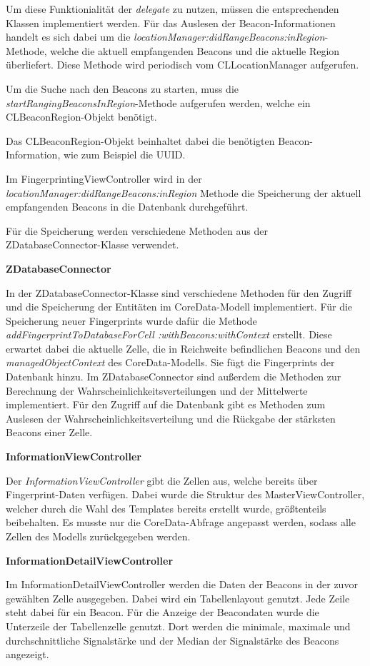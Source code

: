 Um diese Funktionialität der \emph{delegate} zu nutzen, müssen die entsprechenden Klassen implementiert werden. Für das Auslesen der Beacon-Informationen handelt es sich dabei um die \emph{locationManager:didRangeBeacons:inRegion}-Methode, welche die aktuell empfangenden Beacons und die aktuelle Region überliefert. Diese Methode wird periodisch vom CLLocationManager aufgerufen.

Um die Suche nach den Beacons zu starten, muss die \emph{startRangingBeaconsInRegion}-Methode aufgerufen werden, welche ein CLBeaconRegion-Objekt benötigt.

Das CLBeaconRegion-Objekt beinhaltet dabei die benötigten Beacon-Information, wie zum Beispiel die UUID.

Im FingerprintingViewController wird in der \emph{locationManager:didRangeBeacons:inRegion} Methode die Speicherung der aktuell empfangenden Beacons in die Datenbank durchgeführt.

Für die Speicherung werden verschiedene Methoden aus der ZDatabaseConnector-Klasse verwendet.

\textbf{ZDatabaseConnector}

In der ZDatabaseConnector-Klasse sind verschiedene Methoden für den Zugriff und die Speicherung der Entitäten im CoreData-Modell implementiert.
Für die Speicherung neuer Fingerprints wurde dafür die Methode \emph{addFingerprintToDatabaseForCell :withBeacons:withContext} erstellt. Diese erwartet dabei die aktuelle Zelle, die in Reichweite befindlichen Beacons und den \emph{managedObjectContext} des CoreData-Modells. Sie fügt die Fingerprints der Datenbank hinzu.
Im ZDatabaseConnector sind außerdem die Methoden zur Berechnung der Wahrscheinlichkeitsverteilungen und der Mittelwerte implementiert.
Für den Zugriff auf die Datenbank gibt es Methoden zum Auslesen der Wahrscheinlichkeitsverteilung und die Rückgabe der stärksten Beacons einer Zelle.

\textbf{InformationViewController}

Der \emph{InformationViewController} gibt die Zellen aus, welche bereits über Fingerprint-Daten verfügen. Dabei wurde die Struktur des MasterViewController, welcher durch die Wahl des Templates bereits erstellt wurde, größtenteils beibehalten. Es musste nur die CoreData-Abfrage angepasst werden, sodass alle Zellen des Modells zurückgegeben werden.


\textbf{InformationDetailViewController}

Im InformationDetailViewController werden die Daten der Beacons in der zuvor gewählten Zelle ausgegeben. Dabei wird ein Tabellenlayout genutzt. Jede Zeile steht dabei für ein Beacon. 
Für die Anzeige der Beacondaten wurde die Unterzeile der Tabellenzelle genutzt. Dort werden die minimale, maximale und durchschnittliche Signalstärke und der Median der Signalstärke des Beacons angezeigt.


